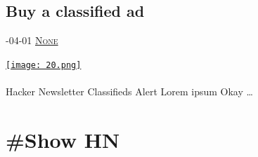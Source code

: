 \documentclass[10pt,a4paper]{article}
\begin{document}
\begin{multicols}{2}
\begin{minipage}{\linewidth}
\subsection{Buy a classified ad}
\textsc{\footnotesize
{\scriptsize\faCalendar}-04-01 
{\scriptsize\faComments}\space 
\href{}{None} 
}
\par\medskip\noindent
\href{https://airtable.com/shr74MwRpJSHRWsFl}{
    \texttt{[image: 20.png]}
}
\end{minipage}
\paragraph{}
Hacker Newsletter Classifieds Alert Lorem ipsum Okay
\dots\par
\end{multicols}

\newpage
\section{\#Show HN}
\end{document}

